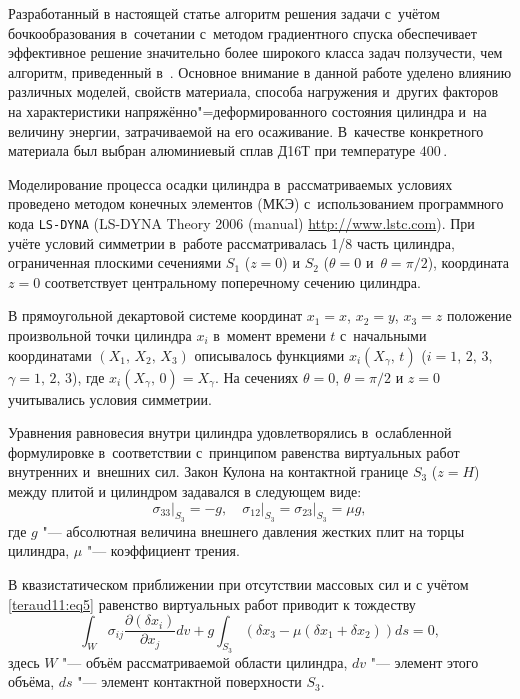 Разработанный в настоящей статье алгоритм решения задачи с~учётом бочкообразования в~сочетании с~методом градиентного спуска обеспечивает эффективное решение значительно более широкого класса задач ползучести, чем алгоритм, приведенный в~\cite{teraud11:2}. 
Основное внимание в данной работе уделено влиянию различных моделей, свойств материала, способа нагружения и~других факторов на характеристики напряжённо"=деформированного состояния цилиндра и~на величину энергии, затрачиваемой на его осаживание. 
В~качестве конкретного материала был выбран алюминиевый сплав Д16Т при температуре $400$\,\textcelsius{}.

\smallskip

 Моделирование процесса осадки цилиндра в~рассматриваемых условиях проведено методом конечных элементов (МКЭ) с~использованием программного кода {\tt LS-DYNA} (LS-DYNA Theory 2006 (manual) \url{http://www.lstc.com}). 
При учёте условий симметрии в~работе рассматривалась 1/8 часть цилиндра, ограниченная плоскими сечениями $S_{1} $ ($z=0$) и $S_{2}$ ($\theta =0$ и~$\theta ={\pi /2}$), координата $z=0$ соответствует центральному поперечному сечению цилиндра.

В прямоугольной декартовой системе координат $x_{1} =x$, $x_{2} =y$, $x_{3} = z$ положение  произвольной точки цилиндра $x_{i}$ в~момент времени $t$ с~начальными координатами $(X_{1},\,X_{2},\, X_{3})$ описывалось функциями
$x_{i} (X_{\gamma},\, t)$ ($i = 1,\,  2,\,  3,$ $\gamma  = 1,\,  2,\,  3$),
 где $x_{i} (X_{\gamma } ,\, 0)=X_{\gamma}$. 
 На сечениях $\theta =0$, $\theta =\pi/2 $ и $z=0$ учитывались условия симметрии.

Уравнения равновесия внутри цилиндра удовлетворялись в~ослабленной формулировке в~соответствии с~принципом равенства виртуальных работ внутренних и~внешних сил. 
Закон Кулона на контактной границе $S_3$ \mbox{($z=H$)} между плитой и цилиндром задавался в следующем виде:
\begin{equation} \label{teraud11:eq5}
\sigma _{33} \big|_{S_{3}} =-g,\quad  \sigma _{12} \big|_{S_{3}} =\sigma _{23} \big|_{S_{3} } =\mu g,
\end{equation}
где $g$ "--- абсолютная величина внешнего давления  жестких плит на торцы цилиндра, $\mu$ "--- коэффициент трения.

В квазистатическом приближении при отсутствии массовых сил и с учётом \eqref{teraud11:eq5} равенство виртуальных работ приводит к
тождеству
\begin{equation} \label{teraud11:eq6}
\int _{W} \sigma _{ij} \frac{\partial (\delta x_{i} )}{\partial x_{j} }  dv + g \int _{S_{3}} (\delta x_{3} -\mu
(\delta x_{1} +\delta x_{2}))ds=0,
\end{equation}
здесь $W$ "--- объём рассматриваемой области цилиндра, $dv$ "--- элемент этого объёма, $ds$ "--- элемент контактной поверхности
$S_{3}$.

